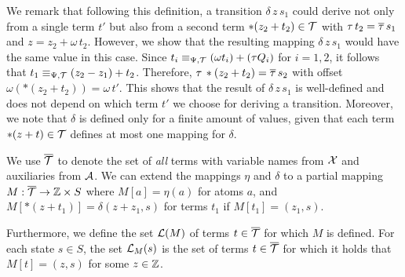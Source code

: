 We remark that following this definition, a transition $\delta\,z\,s_1$ could derive not only from a single term $t'$ but also from a second term $*(z_2 + t_2) \in \mathcal{T}$ with $\tau\,t_2=\overline{\tau}\,s_1$ and $z = z_2 + \omega\,t_2$.
However, we show that the resulting mapping $\delta\,z\,s_1$  would have the same value in this case.
Since $t_i \equiv_{\Psi,\mathcal{T}} (\omega t_i) + (\tau Q_i)$ for $i = 1,2$, it follows that $t_1 \equiv_{\Psi,\mathcal{T}} (z_2 - z_1)+ t_2$.
Therefore, $\tau\,*(z_2+t_2)=\overline{\tau}\,s_2$ with offset $\omega(*(z_2+t_2)) = \omega\,t'$.
This shows that the result of $\delta\,z\,s_1$ is well-defined and does not depend on which term $t'$ we choose for deriving a transition.
Moreover, we note that $\delta$ is defined only for a finite amount of values, given that each term $*(z + t) \in \mathcal{T}$ defines at most one mapping for $\delta$.

We use ${\overline{\mathcal{T}}}$ to denote the set of \emph{all} terms with variable names from $\mathcal{X}$ and auxiliaries from $\mathcal{A}$.
We can extend the mappings $\eta$ and $\delta$ to a partial mapping $M : {\overline{\mathcal{T}}} \rightarrow \mathbb{Z} \times S$ where $M[a] = \eta(a)$ for atoms $a$, and $M[*(z+t_1)] = \delta(z+z_1, s)$ for terms $t_1$ if $M[t_1] = (z_1,s)$.

Furthermore, we define the set $\mathcal{L}(M)$ of terms $t \in {\overline{\mathcal{T}}}$ for which $M$ is defined.
For each state $s \in S$, the set $\mathcal{L}_{M}(s)$ is the set of terms $t \in {\overline{\mathcal{T}}}$ for which it holds that $M[t] = (z, s)$ for some $z \in \mathbb{Z}$.

